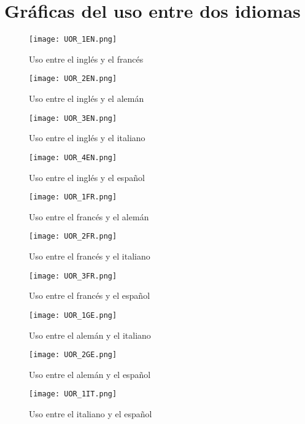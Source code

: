 \section{Gráficas del uso entre dos idiomas}
\label{palabras.acumuladas.apendice}

\begin{figure}[h!]
	\centering
	\texttt{[image: UOR\_1EN.png]}
	\label{fig.U_EF}
	\caption{Uso entre el inglés y el francés}
\end{figure}


\begin{figure}[h!]
	\centering
	\texttt{[image: UOR\_2EN.png]}
	\label{fig.U_EG}
	\caption{Uso entre el inglés y el alemán}
\end{figure}


\begin{figure}[h!]
	\centering
	\texttt{[image: UOR\_3EN.png]}
	\label{fig.U_EI}
	\caption{Uso entre el inglés y el italiano}
\end{figure}

\begin{figure}[h!]
	\centering
	\texttt{[image: UOR\_4EN.png]}
	\label{fig.U_ES}
	\caption{Uso entre el inglés y el español}
\end{figure}

\begin{figure}[h!]
	\centering
	\texttt{[image: UOR\_1FR.png]}
	\label{fig.U_FG}
	\caption{Uso entre el francés y el alemán}
\end{figure}

\begin{figure}[h!]
	\centering
	\texttt{[image: UOR\_2FR.png]}
	\label{fig.U_FI}
	\caption{Uso entre el francés y el italiano}
\end{figure}

\begin{figure}[h!]
	\centering
	\texttt{[image: UOR\_3FR.png]}
	\label{fig.U_FS}
	\caption{Uso entre el francés y el español}
\end{figure}



\begin{figure}[h!]
	\centering
	\texttt{[image: UOR\_1GE.png]}
	\label{fig.U_GI}
	\caption{Uso entre el alemán y el italiano}
\end{figure}


\begin{figure}[h!]
	\centering
	\texttt{[image: UOR\_2GE.png]}
	\label{fig.U_GS}
	\caption{Uso entre el alemán y el español}
\end{figure}


\begin{figure}[h!]
	\centering
	\texttt{[image: UOR\_1IT.png]}
	\label{fig.U_IS}
	\caption{Uso entre el italiano y el español}
\end{figure}



